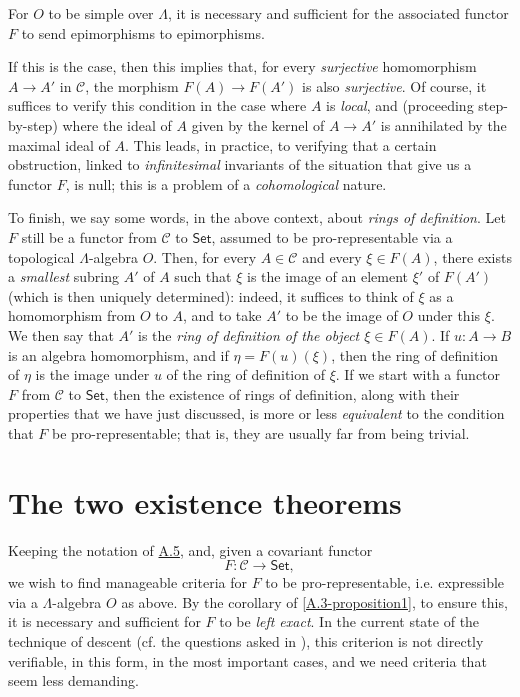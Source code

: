 \documentclass{article}
\theoremstyle{plain}
\newenvironment{proposition}[1]
  {\renewcommand\theinnercustomproposition{#1}\innercustomproposition}
  {\endinnercustomproposition}
\theoremstyle{definition}
\newcommand{\cat}[1]{{\mathcal{#1}}}
\newcommand{\Set}{\mathsf{Set}}
\newcommand{\oldpage}[1]{\marginpar{\footnotesize$\Big\vert$ \textit{p.~#1}}}
\begin{document}
\begin{proposition}{5.2}
\label{A.5-proposition2}
  For $O$ to be simple over $\Lambda$, it is necessary and sufficient for the associated functor $F$ to send epimorphisms to epimorphisms.
\end{proposition}

If this is the case, then this implies that, for every \emph{surjective} homomorphism $A\to A'$ in $\cat{C}$, the morphism $F(A)\to F(A')$ is also \emph{surjective}.
Of course, it suffices to verify this condition in the case where $A$ is \emph{local}, and (proceeding step-by-step) where the ideal of $A$ given by the kernel of $A\to A'$ is annihilated by the maximal ideal of $A$.
This leads, in practice, to verifying that a certain obstruction, linked to \emph{infinitesimal} invariants
\oldpage{195-09}
of the situation that give us a functor $F$, is null;
this is a problem of a \emph{cohomological} nature.

To finish, we say some words, in the above context, about \emph{rings of definition}.
Let $F$ still be a functor from $\cat{C}$ to $\Set$, assumed to be pro-representable via a topological $\Lambda$-algebra $O$.
Then, for every $A\in\cat{C}$ and every $\xi\in F(A)$, there exists a \emph{smallest} subring $A'$ of $A$ such that $\xi$ is the image of an element $\xi'$ of $F(A')$ (which is then uniquely determined):
indeed, it suffices to think of $\xi$ as a homomorphism from $O$ to $A$, and to take $A'$ to be the image of $O$ under this $\xi$.
We then say that $A'$ is the \emph{ring of definition of the object $\xi\in F(A)$}.
If $u\colon A\to B$ is an algebra homomorphism, and if $\eta=F(u)(\xi)$, then the ring of definition of $\eta$ is the image under $u$ of the ring of definition of $\xi$.
If we start with a functor $F$ from $\cat{C}$ to $\Set$, then the existence of rings of definition, along with their properties that we have just discussed, is more or less \emph{equivalent} to the condition that $F$ be pro-representable;
that is, they are usually far from being trivial.


\part{The two existence theorems}
\label{B}

Keeping the notation of \hyperref[A.5]{A.5}, and, given a covariant functor
\[
  F\colon \cat{C} \to \Set,
\]
we wish to find manageable criteria for $F$ to be pro-representable, i.e. expressible via a $\Lambda$-algebra $O$ as above.
By the corollary of \cref{A.3-proposition1}, to ensure this, it is necessary and sufficient for $F$ to be \emph{left exact}.
In the current state of the technique of descent (cf. the questions asked in \cite[p.~9]{3}), this criterion is not directly verifiable, in this form, in the most important cases, and we need criteria that seem less demanding.
\end{document}
